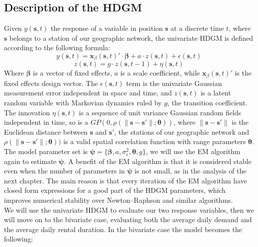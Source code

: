 \subsection{Description of the HDGM}

Given $y(\boldsymbol{s},t)$  the response of a variable in position $\boldsymbol{s}$ at a discrete time $t$, where $\boldsymbol{s}$ belongs to a station of our geographic network, the univariate HDGM is defined according to the following formula:
\begin{displaymath}
	y(\boldsymbol{s}, t) = \boldsymbol{x}_\beta(\boldsymbol{s}, t)' \cdot \boldsymbol{\beta} + a \cdot z(\boldsymbol{s}, t) + \epsilon(\boldsymbol{s}, t)
\end{displaymath}
\begin{displaymath}
	z(\boldsymbol{s}, t) = g \cdot z(\boldsymbol{s}, t-1) + \eta(\boldsymbol{s}, t)
\end{displaymath}
Where $\boldsymbol{\beta}$ is a vector of fixed effects, $a$ is a scale coefficient, while $\boldsymbol{x}_\beta(\boldsymbol{s}, t)'$ is the fixed effects design vector. The $\epsilon(\boldsymbol{s}, t)$ term is the univariate Gaussian measurement error independent in space and time, and $z(\boldsymbol{s}, t)$ is a latent random variable with Markovian dynamics ruled by $g$, the transition coefficient. The innovation $\eta(\boldsymbol{s}, t)$ is a sequence of unit variance Gaussian random fields independent in time, so is a $GP(0, \rho(\lVert \boldsymbol{s}-\boldsymbol{s'} \rVert;\boldsymbol{\theta}))$, where $\lVert \boldsymbol{s}-\boldsymbol{s'} \rVert$ is the Euclidean distance between $\boldsymbol{s}$ and $\boldsymbol{s'}$, the stations of our geographic network and $\rho(\lVert \boldsymbol{s}-\boldsymbol{s'} \rVert;\boldsymbol{\theta}))$ is a valid spatial correlation function with range parameters $\boldsymbol{\theta}$. 
\\ The model parameter set is $\boldsymbol{\psi} = \{\boldsymbol{\beta}, a, \sigma_\epsilon^2, \boldsymbol{\theta}, g\}$, we will use the EM algorithm again to estimate $\boldsymbol{\psi}$. A benefit of the EM algorithm is that it is considered stable even when the number of parameters in $\boldsymbol{\psi}$ is not small, as in the analysis of the next chapter. The main reason is that every iteration of the EM algorithm have closed form expressions for a good part of the HDGM parameters, which improves numerical stability over Newton–Raphson and similar algorithms. 
\\ We will use the univariate HDGM to evaluate our two response variables, then we will move on to the bivariate case, evaluating both the average daily demand and the average daily rental duration. In the bivariate case the model becomes the following:
